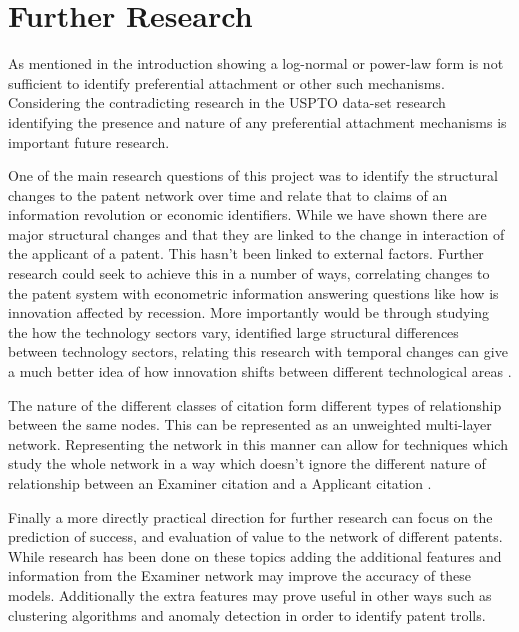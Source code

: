 \section{Further Research}

As mentioned in the introduction showing a log-normal or power-law form is not sufficient to identify preferential attachment or other such mechanisms. Considering the contradicting research in the USPTO data-set research identifying the presence and nature of any preferential attachment mechanisms is important future research. 

One of the main research questions of this project was to identify the structural changes to the patent network over time and relate that to claims of an information revolution or economic identifiers. While we have shown there are major structural changes and that they are linked to the change in interaction of the applicant of a patent. This hasn't been linked to external factors. Further research could seek to achieve this in a number of ways, correlating changes to the patent system with econometric information answering questions like how is innovation affected by recession. More importantly would be through studying the how the technology sectors vary,  identified large structural differences between technology sectors, relating this research with temporal changes can give a much better idea of how innovation shifts between different technological areas \cite{gress2010properties}. 

The nature of the different classes of citation form different types of relationship between the same nodes. This can be represented as an unweighted multi-layer network. Representing the network in this manner can allow for techniques which study the whole network in a way which doesn't ignore the different nature of relationship between an Examiner citation and a Applicant citation \cite{hardtoSpell}. 

Finally a more directly practical direction for further research can focus on the prediction of success, and evaluation of value to the network of different patents. While research has been done on these topics adding the additional features and information from the Examiner network may improve the accuracy of these models. Additionally the extra features may prove useful in other ways such as clustering algorithms and anomaly detection in order to identify patent trolls. 